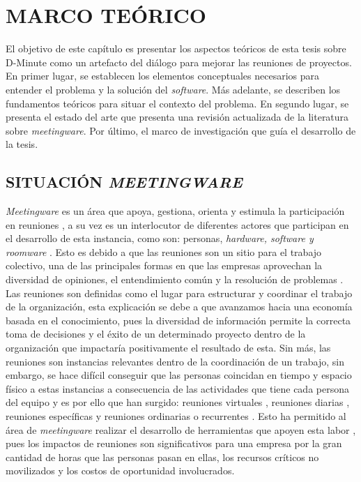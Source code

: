 \section{MARCO TEÓRICO}

El objetivo de este capítulo es presentar los aspectos teóricos de esta tesis sobre D-Minute como un artefacto del diálogo para mejorar las reuniones de proyectos. En primer lugar, se establecen los elementos conceptuales necesarios para entender el problema y la solución del \textit{software}. Más adelante, se describen los fundamentos teóricos para situar el contexto del problema. En segundo lugar, se presenta el estado del arte que presenta una revisión actualizada de la literatura sobre \textit{meetingware}. Por último, el marco de investigación que guía el desarrollo de la tesis.

\subsection{SITUACIÓN \textit{MEETINGWARE}}

\textit{Meetingware} es un área que apoya, gestiona, orienta y estimula la participación en reuniones  \cite{RN7}, a su vez es un interlocutor de diferentes actores que participan en el desarrollo de esta instancia, como son: personas, \textit{hardware, software y roomware} \cite{RN7}. Esto es debido a que las reuniones son un sitio para el trabajo colectivo, una de las principales formas en que las empresas aprovechan la diversidad de opiniones, el entendimiento común y la resolución de problemas \cite{RN25}. Las reuniones son definidas como el lugar para estructurar y coordinar el trabajo de la organización, esta explicación se debe a que avanzamos hacia una economía basada en el conocimiento, pues la diversidad de información permite la correcta toma de decisiones y el éxito de un determinado proyecto dentro de la organización \cite{RN7} que impactaría positivamente el resultado de esta. Sin más, las reuniones son instancias relevantes dentro de la coordinación de un trabajo, sin embargo, se hace difícil conseguir que las personas coincidan en tiempo y espacio físico a estas instancias a consecuencia de las actividades que tiene cada persona del equipo y es por ello que han surgido: reuniones virtuales \cite{RN23}, reuniones diarias \cite{RN35}, reuniones específicas y reuniones ordinarias o recurrentes \cite{RN25}. Esto ha permitido al área de \textit{meetingware} realizar el desarrollo de herramientas que apoyen esta labor \cite{RN28}, pues los impactos de reuniones son significativos para una empresa por la gran cantidad de horas que las personas pasan en ellas, los recursos críticos no movilizados y los costos de oportunidad involucrados.

